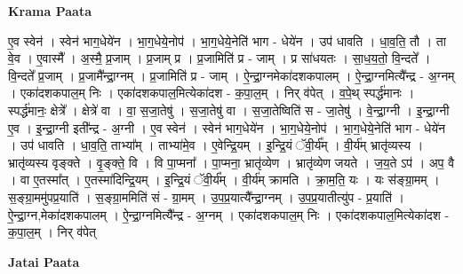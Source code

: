 \documentclass[17pt]{extarticle}
\begin{document}
\textbf{Krama Paata} \newline

ए॒व स्वेन॑ । स्वेन॑ भाग॒धेये॑न । भा॒ग॒धेये॒नोप॑ । भा॒ग॒धेये॒नेति॑ भाग - धेये॑न । उप॑ धावति । धा॒व॒ति॒ तौ । ता वे॒व । ए॒वास्मै᳚ । अ॒स्मै॒ प्र॒जाम् । प्र॒जाम् प्र । प्र॒जामिति॑ प्र - जाम् । प्र सा॑धयतः । सा॒ध॒य॒तो॒ वि॒न्दते᳚ । वि॒न्दते᳚ प्र॒जाम् । प्र॒जामै᳚न्द्रा॒ग्नम् । प्र॒जामिति॑ प्र - जाम् । ऐ॒न्द्रा॒ग्नमेका॑दशकपालम् । ऐ॒न्द्रा॒ग्नमित्यै᳚न्द्र - अ॒ग्नम् । एका॑दशकपाल॒म् निः । एका॑दशकपाल॒मित्येका॑दश - क॒पा॒ल॒म् । निर् व॑पेत् । व॒पे॒थ् स्पर्द्ध॑मानः । स्पर्द्ध॑मानः॒ क्षेत्रे᳚ । क्षेत्रे॑ वा । वा॒ स॒जा॒तेषु॑ । स॒जा॒तेषु॑ वा । स॒जा॒तेष्विति॑ स - जा॒तेषु॑ । वे॒न्द्रा॒ग्नी । इ॒न्द्रा॒ग्नी ए॒व । इ॒न्द्रा॒ग्नी इती᳚न्द्र - अ॒ग्नी । ए॒व स्वेन॑ । स्वेन॑ भाग॒धेये॑न । भा॒ग॒धेये॒नोप॑ । भा॒ग॒धेये॒नेति॑ भाग - धेये॑न । उप॑ धावति । धा॒व॒ति॒ ताभ्या᳚म् । ताभ्या॑मे॒व । ए॒वेन्द्रि॒यम् । इ॒न्द्रि॒यं ॅवी॒र्य᳚म् । वी॒र्य॑म् भ्रातृ॑व्यस्य । भ्रातृ॑व्यस्य वृङ्क्ते । वृ॒ङ्क्ते॒ वि । वि पा॒प्मना᳚ । पा॒प्मना॒ भ्रातृ॑व्येण । भ्रातृ॑व्येण जयते । ज॒य॒ते ऽप॑ । अप॒ वै । वा ए॒तस्मा᳚त् । ए॒तस्मा॑दिन्द्रि॒यम् । इ॒न्द्रि॒यं ॅवी॒र्य᳚म् । वी॒र्य॑म् क्रामति । क्रा॒म॒ति॒ यः । यः स॑ङ्ग्रा॒मम् । स॒ङ्ग्रा॒ममु॑पप्र॒याति॑ । स॒ङ्ग्रा॒ममिति॑ सं - ग्रा॒मम् । उ॒प॒प्र॒यात्यै᳚न्द्रा॒ग्नम् । उ॒प॒प्र॒यातीत्यु॑प - प्र॒याति॑ । ऐ॒न्द्रा॒ग्न,मेका॑दशकपालम् । ऐ॒न्द्रा॒ग्नमित्यै᳚न्द्र - अ॒ग्नम् । एका॑दशकपाल॒म् निः । एका॑दशकपाल॒मित्येका॑दश - क॒पा॒ल॒म् । निर् व॑पेत् \newline

\textbf{Jatai Paata} \newline
\end{document}
